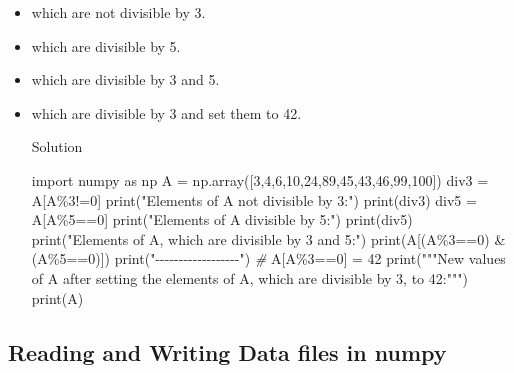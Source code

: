 \documentclass[11pt]{article}
\providecommand{\tightlist}{%
      \setlength{\itemsep}{0pt}\setlength{\parskip}{0pt}}
\newenvironment{Shaded}{}{}
\newcommand{\DecValTok}[1]{\textcolor[rgb]{0.25,0.63,0.44}{{#1}}}
\newcommand{\StringTok}[1]{\textcolor[rgb]{0.25,0.44,0.63}{{#1}}}
\newcommand{\CommentTok}[1]{\textcolor[rgb]{0.38,0.63,0.69}{\textit{{#1}}}}
\newcommand{\NormalTok}[1]{{#1}}
\newcommand{\ImportTok}[1]{{#1}}
\newcommand{\OperatorTok}[1]{\textcolor[rgb]{0.40,0.40,0.40}{{#1}}}
\newcommand{\BuiltInTok}[1]{{#1}}
\begin{document}
\begin{itemize}
\tightlist
\item
  which are not divisible by 3.
\item
  which are divisible by 5.
\item
  which are divisible by 3 and 5.
\item
  which are divisible by 3 and set them to 42.

  Solution

\begin{Shaded}
\begin{Highlighting}[]
  \ImportTok{import}\NormalTok{ numpy }\ImportTok{as}\NormalTok{ np}
\NormalTok{  A }\OperatorTok{=}\NormalTok{ np.array([}\DecValTok{3}\NormalTok{,}\DecValTok{4}\NormalTok{,}\DecValTok{6}\NormalTok{,}\DecValTok{10}\NormalTok{,}\DecValTok{24}\NormalTok{,}\DecValTok{89}\NormalTok{,}\DecValTok{45}\NormalTok{,}\DecValTok{43}\NormalTok{,}\DecValTok{46}\NormalTok{,}\DecValTok{99}\NormalTok{,}\DecValTok{100}\NormalTok{])}
\NormalTok{  div3 }\OperatorTok{=}\NormalTok{ A[A}\OperatorTok{\%}\DecValTok{3}\OperatorTok{!=}\DecValTok{0}\NormalTok{]}
  \BuiltInTok{print}\NormalTok{(}\StringTok{"Elements of A not divisible by 3:"}\NormalTok{)}
  \BuiltInTok{print}\NormalTok{(div3)}
\NormalTok{  div5 }\OperatorTok{=}\NormalTok{ A[A}\OperatorTok{\%}\DecValTok{5}\OperatorTok{==}\DecValTok{0}\NormalTok{]}
  \BuiltInTok{print}\NormalTok{(}\StringTok{"Elements of A divisible by 5:"}\NormalTok{)}
  \BuiltInTok{print}\NormalTok{(div5)}
  \BuiltInTok{print}\NormalTok{(}\StringTok{"Elements of A, which are divisible by 3 and 5:"}\NormalTok{)}
  \BuiltInTok{print}\NormalTok{(A[(A}\OperatorTok{\%}\DecValTok{3}\OperatorTok{==}\DecValTok{0}\NormalTok{) }\OperatorTok{\&}\NormalTok{ (A}\OperatorTok{\%}\DecValTok{5}\OperatorTok{==}\DecValTok{0}\NormalTok{)])}
  \BuiltInTok{print}\NormalTok{(}\StringTok{"{-}{-}{-}{-}{-}{-}{-}{-}{-}{-}{-}{-}{-}{-}{-}{-}{-}{-}"}\NormalTok{)}
  \CommentTok{\#}
\NormalTok{  A[A}\OperatorTok{\%}\DecValTok{3}\OperatorTok{==}\DecValTok{0}\NormalTok{] }\OperatorTok{=} \DecValTok{42}
  \BuiltInTok{print}\NormalTok{(}\StringTok{"""New values of A after setting the elements of A,}
\StringTok{  which are divisible by 3, to 42:"""}\NormalTok{)}
  \BuiltInTok{print}\NormalTok{(A)}
\end{Highlighting}
\end{Shaded}
\end{itemize}

\hypertarget{reading-and-writing-data-files-in-numpy}{%
\subsection{Reading and Writing Data files in
numpy}\label{reading-and-writing-data-files-in-numpy}}
\end{document}
